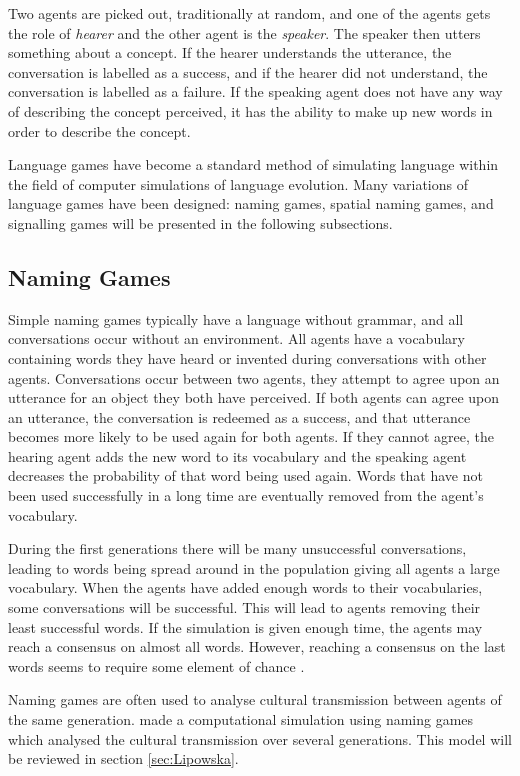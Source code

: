 Two agents are picked out, traditionally at random, and one of the agents gets the role of \textit{hearer} and the other agent is the \textit{speaker}. The speaker then utters something about a concept. If the hearer understands the utterance, the conversation is labelled as a success, and if the hearer did not understand, the conversation is labelled as a failure. If the speaking agent does not have any way of describing the concept perceived, it has the ability to make up new words in order to describe the concept. 

Language games have become a standard method of simulating language within the field of computer simulations of language evolution. Many variations of language games have been designed: naming games, spatial naming games, and signalling games will be presented in the following subsections.

\subsection{Naming Games}
Simple naming games typically have a language without grammar, and all conversations occur without an environment. All agents have a vocabulary containing words they have heard or invented during conversations with other agents. Conversations occur between two agents, they attempt to agree upon an utterance for an object they both have perceived. If both agents can agree upon an utterance, the conversation is redeemed as a success, and that utterance becomes more likely to be used again for both agents. If they cannot agree, the hearing agent adds the new word to its vocabulary and the speaking agent decreases the probability of that word being used again. Words that have not been used successfully in a long time are eventually removed from the agent's vocabulary.

During the first generations there will be many unsuccessful conversations, leading to words being spread around in the population giving all agents a large vocabulary. When the agents have added enough words to their vocabularies, some conversations will be successful. This will lead to agents removing their least successful words. If the simulation is given enough time, the agents may reach a consensus on almost all words. However, reaching a consensus on the last words seems to require some element of chance \citep{steels1997synthetic}.

Naming games are often used to analyse cultural transmission between agents of the same generation. \citeauthor{lipowska2011naming} made a computational simulation using naming games which analysed the cultural transmission over several generations. This model will be reviewed in section \ref{sec:Lipowska}.

